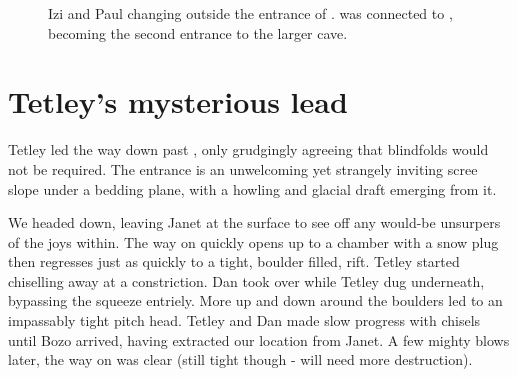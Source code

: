 \begin{figure}[t]
\checkoddpage \ifoddpage \forcerectofloat \else \forceversofloat \fi
{}
\caption{Izi and Paul changing outside the entrance of \protect{}. \protect{} was connected to \protect{}, becoming the second entrance to the larger cave. }
\end{figure}

\section{Tetley's mysterious lead}

Tetley led the way down past , only grudgingly agreeing that blindfolds would not be required. The entrance is an unwelcoming yet
strangely inviting scree slope under a bedding plane, with a howling and
glacial draft emerging from it.

We headed down, leaving Janet at the surface to see off any would-be
unsurpers of the joys within. The way on quickly opens up to a chamber
with a snow plug then regresses just as quickly to a tight, boulder
filled, rift. Tetley started chiselling away at a constriction. Dan took
over while Tetley dug underneath, bypassing the squeeze entriely. More
up and down around the boulders led to an impassably tight pitch head.
Tetley and Dan made slow progress with chisels until Bozo arrived, having
extracted our location from Janet. A few mighty blows later, the way on
was clear (still tight though - will need more destruction).

